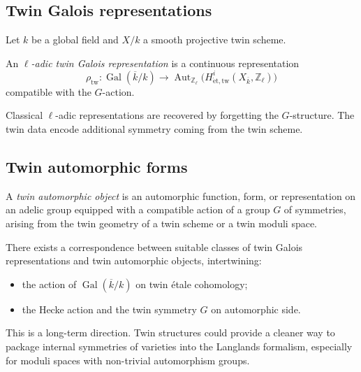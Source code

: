 \documentclass[11pt,a4paper]{article}
\numberwithin{equation}{section}
\newcommand{\Z}{\mathbb{Z}}
\DeclareMathOperator{\Gal}{Gal}
\DeclareMathOperator{\Aut}{Aut}
\begin{document}
	\subsection{Twin Galois representations}
	
	Let $k$ be a global field and $X/k$ a smooth projective twin scheme.
	
	\begin{definition}
		An \emph{$\ell$-adic twin Galois representation} is a continuous representation
		\[
		\rho_{\mathrm{tw}} : \Gal(\overline{k}/k)\to \Aut_{\Z_\ell}\big(H^i_{\mathrm{\acute{e}t,tw}}(X_{\overline{k}},\Z_\ell)\big)
		\]
		compatible with the $G$-action.
	\end{definition}
	
	\begin{remark}
		Classical $\ell$-adic representations are recovered by forgetting the $G$-structure.
		The twin data encode additional symmetry coming from the twin scheme.
	\end{remark}
	
	\subsection{Twin automorphic forms}
	
	\begin{definition}
		A \emph{twin automorphic object} is an automorphic function, form, or representation on an adelic group
		equipped with a compatible action of a group $G$ of symmetries, arising from the twin geometry of 
		a twin scheme or a twin moduli space.
	\end{definition}
	
	\begin{conjecture}
		There exists a correspondence between suitable classes of twin Galois representations and 
		twin automorphic objects, intertwining:
		\begin{itemize}
			\item the action of $\Gal(\overline{k}/k)$ on twin \'etale cohomology;
			\item the Hecke action and the twin symmetry $G$ on automorphic side.
		\end{itemize}
	\end{conjecture}
	
	\begin{remark}
		This is a long-term direction.
		Twin structures could provide a cleaner way to package internal symmetries of varieties 
		into the Langlands formalism, especially for moduli spaces with non-trivial automorphism groups.
	\end{remark}
	
\end{document}
